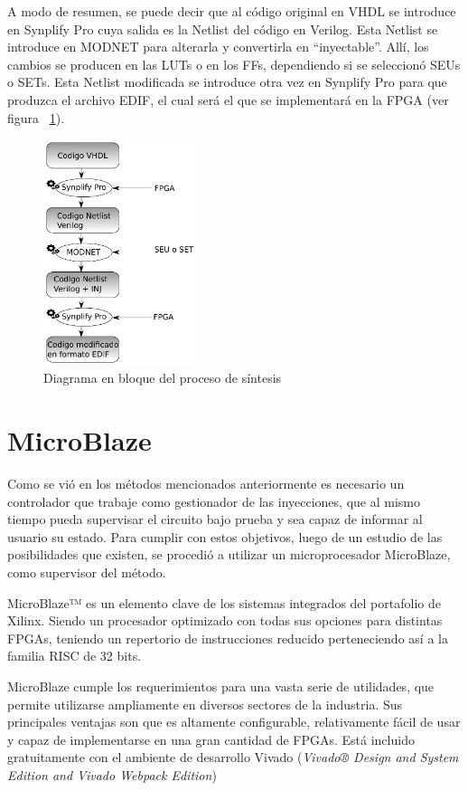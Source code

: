 \documentclass[a4paper,openright,12pt]{report}
\begin{document}
A modo de resumen, se puede decir que al código original en VHDL se introduce en Synplify Pro cuya  salida es la Netlist del código en Verilog. Esta Netlist se introduce en MODNET para alterarla y convertirla en “inyectable”.  Allí, los cambios se producen en las LUTs o en los FFs, dependiendo si se seleccionó SEUs o SETs. Esta Netlist modificada se introduce  otra vez en Synplify Pro  para que produzca el archivo EDIF, el cual será el que se implementará en la FPGA (ver figura ~\ref{MODNET}).


\begin{figure}[H]
	\centering
	\includegraphics[width=0.4\textwidth]{img/MODNET.pdf}
	\caption{Diagrama en bloque del proceso de síntesis}
	\label{MODNET}
\end{figure}


\section{MicroBlaze}

Como se vió en los métodos mencionados anteriormente es necesario un controlador que trabaje como gestionador de las inyecciones, que al mismo tiempo pueda supervisar el circuito bajo prueba y sea capaz de informar al usuario su estado.
Para cumplir con estos objetivos, luego de un estudio de las posibilidades que existen, se procedió a utilizar un microprocesador MicroBlaze, como supervisor del método.

MicroBlaze™ es un elemento clave de los sistemas integrados del portafolio de Xilinx. Siendo un procesador optimizado con todas sus opciones para distintas FPGAs,  teniendo un repertorio de instrucciones reducido perteneciendo así a la familia RISC de 32 bits. 

MicroBlaze cumple los requerimientos para una vasta serie de utilidades, que permite utilizarse ampliamente en diversos sectores de la industria. Sus principales ventajas son que es altamente configurable, relativamente fácil de usar y capaz de implementarse en una gran cantidad de FPGAs. Está incluido gratuitamente con el ambiente de desarrollo Vivado (\textit{Vivado® Design and System Edition and Vivado Webpack Edition})
\end{document}
